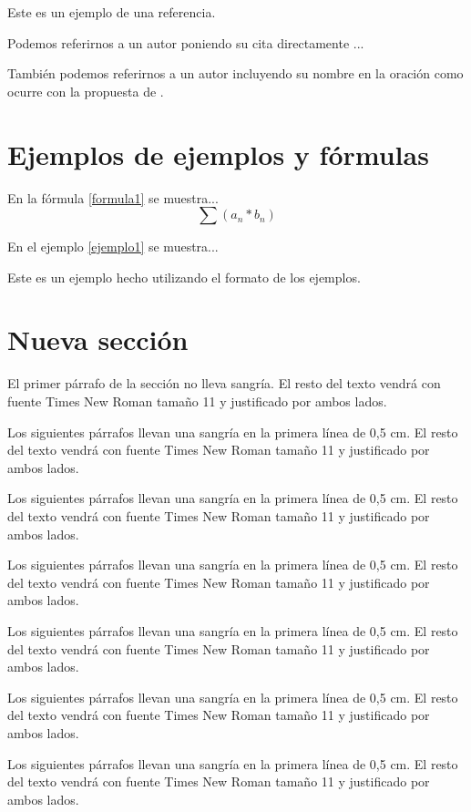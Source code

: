 \documentclass[a4paper,11pt,twocolumn,twoside]{article}
\begin{document}
Este es un ejemplo de una referencia.

Podemos referirnos a un autor poniendo su cita directamente
\cite{Allen97}...

También podemos referirnos a un autor incluyendo su nombre en la
oración como ocurre con la propuesta de .

\section{Ejemplos de ejemplos y fórmulas}
En la fórmula \ref{formula1} se muestra...
\begin{equation}
\sum (a_n*b_n) \label{formula1}
\end{equation}

En el ejemplo \ref{ejemplo1} se muestra...
\begin{example}
Este es un ejemplo hecho utilizando el formato de los ejemplos.
\label{ejemplo1}
\end{example}

\section{Nueva sección}

El primer párrafo de la sección no lleva sangría. El resto del
texto vendrá con fuente Times New Roman tamaño 11 y justificado
por ambos lados.

Los siguientes párrafos llevan una sangría en la primera línea de
0,5 cm. El resto del texto vendrá con fuente Times New Roman
tamaño 11 y justificado por ambos lados.

Los siguientes párrafos llevan una sangría en la primera línea de
0,5 cm. El resto del texto vendrá con fuente Times New Roman
tamaño 11 y justificado por ambos lados.

Los siguientes párrafos llevan una sangría en la primera línea de
0,5 cm. El resto del texto vendrá con fuente Times New Roman
tamaño 11 y justificado por ambos lados.

Los siguientes párrafos llevan una sangría en la primera línea de
0,5 cm. El resto del texto vendrá con fuente Times New Roman
tamaño 11 y justificado por ambos lados.

Los siguientes párrafos llevan una sangría en la primera línea de
0,5 cm. El resto del texto vendrá con fuente Times New Roman
tamaño 11 y justificado por ambos lados.

Los siguientes párrafos llevan una sangría en la primera línea de
0,5 cm. El resto del texto vendrá con fuente Times New Roman
tamaño 11 y justificado por ambos lados.
\end{document}
